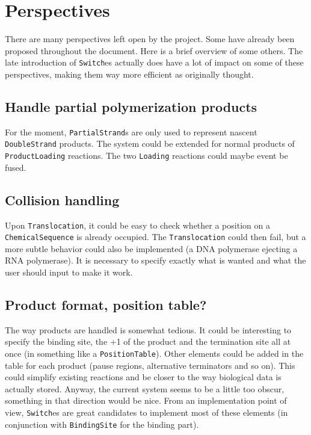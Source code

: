 
\section{Perspectives}

There are many perspectives left open by the project. Some have already been proposed throughout the document. Here is a brief overview of some others. The late introduction of \texttt{Switch}es actually does have a lot of impact on some of these perspectives, making them way more efficient as originally thought.

\subsection{Handle partial polymerization products}

For the moment, \texttt{PartialStrand}s are only used to represent nascent \texttt{DoubleStrand} products. The system could be extended for normal products of \texttt{ProductLoading} reactions. The two \texttt{Loading} reactions could maybe event be fused.

\subsection{Collision handling}

Upon \texttt{Translocation}, it could be easy to check whether a position on a \texttt{ChemicalSequence} is already occupied. The \texttt{Translocation} could then fail, but a more subtle behavior could also be implemented (a DNA polymerase ejecting a RNA polymerase). It is necessary to specify exactly what is wanted and what the user should input to make it work.

\subsection{Product format, position table?}

The way products are handled is somewhat tedious. It could be interesting to specify the binding site, the +1 of the product and the termination site all at once (in something like a \texttt{PositionTable}). Other elements could be added in the table for each product (pause regions, alternative terminators and so on). This could simplify existing reactions and be closer to the way biological data is actually stored. Anyway, the current system seems to be a little too obscur, something in that direction would be nice. From an implementation point of view, \texttt{Switch}es are great candidates to implement most of these elements (in conjunction with \texttt{BindingSite} for the binding part).

